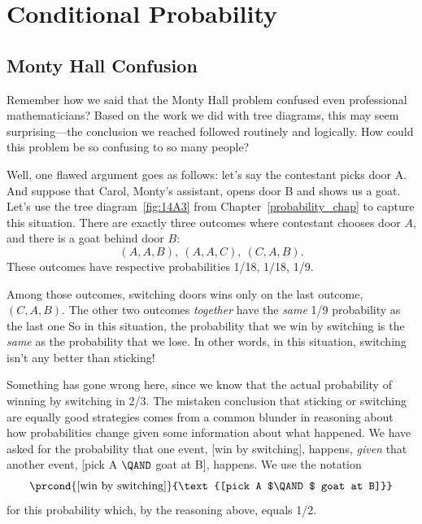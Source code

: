 \chapter{Conditional Probability}\label{chap:cond_prob} %

\begin{editingnotes}
\end{editingnotes}

\section{Monty Hall Confusion}\label{sec:confuse_Monty}
Remember how we said that the Monty Hall problem confused even
professional mathematicians?  Based on the work we did with tree
diagrams, this may seem surprising---the conclusion we reached
followed routinely and logically.  How could this problem be so
confusing to so many people?

Well, one flawed argument goes as follows: let's say the contestant
picks door A.  And suppose that Carol, Monty's assistant, opens door B
and shows us a goat.  Let's use the tree diagram~\ref{fig:14A3} from
Chapter~\ref{probability_chap} to capture this situation.  There are
exactly three outcomes where contestant chooses door $A$, and there is
a goat behind door $B$:
\begin{equation}\label{aabaaccab}
(A, A, B),\ (A, A, C),\ (C, A, B).
\end{equation}
These outcomes have respective probabilities 1/18, 1/18, 1/9.

Among those outcomes, switching doors wins only on the last outcome,
$(C, A, B)$.  The other two outcomes \emph{together} have the
\emph{same} 1/9 probability as the last one So in this situation, the
probability that we win by switching is the \emph{same} as the
probability that we lose.  In other words, in this situation,
switching isn't any better than sticking!

Something has gone wrong here, since we know that the actual
probability of winning by switching in 2/3.  The mistaken conclusion
that sticking or switching are equally good strategies comes from a
common blunder in reasoning about how probabilities change given some
information about what happened.  We have asked for the probability
that one event, [win by switching], happens, \emph{given} that another
event, [pick A $\QAND$ goat at B], happens.  We use the notation
\[
\prcond{\text{[win by switching]}}{\text{[pick A $\QAND$ goat at B]}}
\]
for this probability which, by the reasoning above, equals 1/2.

